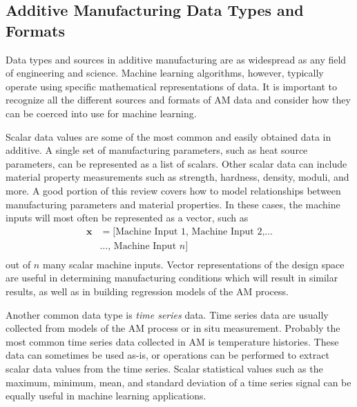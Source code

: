 \subsection{Additive Manufacturing Data Types and Formats}
Data types and sources in additive manufacturing are as widespread as any field of engineering and science. Machine learning algorithms, however, typically operate using specific mathematical representations of data. It is important to recognize all the different sources and formats of AM data and consider how they can be coerced into use for machine learning. 

Scalar data values are some of the most common and easily obtained data in additive. A single set of manufacturing parameters, such as heat source parameters, can be represented as a list of scalars. Other scalar data can include material property measurements such as strength, hardness, density, moduli, and more. A good portion of this review covers how to model relationships between manufacturing parameters and material properties. In these cases, the machine inputs will most often be represented as a vector, such as
\begin{equation}
\begin{split}
	\mathbf{x} & = \text{[} \text{Machine Input 1, Machine Input 2,} \hdots  \\
		& \hdots \text{, Machine Input } n \text{]} \\
	\label{vector}
\end{split}
\end{equation}
out of $n$ many scalar machine inputs. Vector representations of the design space are useful in determining manufacturing conditions which will result in similar results, as well as in building regression models of the AM process.

Another common data type is \textit{time series} data. Time series data are usually collected from models of the AM process or in situ measurement. Probably the most common time series data collected in AM is temperature histories. These data can sometimes be used as-is, or operations can be performed to extract scalar data values from the time series. Scalar statistical values such as the maximum, minimum, mean, and standard deviation of a time series signal can be equally useful in machine learning applications.

